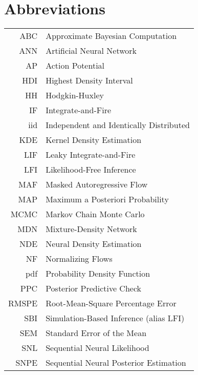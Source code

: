 \chapter*{Abbreviations}
\thispagestyle{plain}



\begin{longtable}{rl}
    ABC & Approximate Bayesian Computation \\
    ANN & Artificial Neural Network \\
    AP & Action Potential \\
    HDI & Highest Density Interval \\
    HH & Hodgkin-Huxley \\
    IF & Integrate-and-Fire \\
    iid & Independent and Identically Distributed \\
    KDE & Kernel Density Estimation \\
    LIF & Leaky Integrate-and-Fire \\
    LFI & Likelihood-Free Inference \\
    MAF & Masked Autoregressive Flow \\
    MAP &  Maximum a Posteriori Probability \\
    MCMC & Markov Chain Monte Carlo \\
    MDN & Mixture-Density Network \\
    NDE & Neural Density Estimation \\
    NF & Normalizing Flows \\
    pdf & Probability Density Function \\
    PPC & Posterior Predictive Check \\
    RMSPE & Root-Mean-Square Percentage Error \\
    SBI & Simulation-Based Inference (alias LFI) \\
    SEM & Standard Error of the Mean \\
    SNL & Sequential Neural Likelihood \\
    SNPE & Sequential Neural Posterior Estimation \\
\end{longtable}

